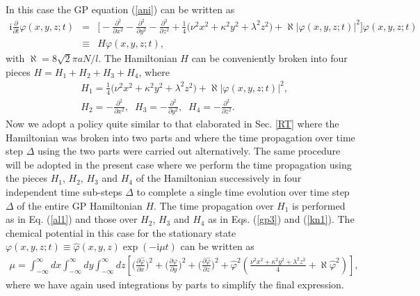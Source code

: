 \documentclass[onecolumn]{elsart3p}
\begin{document}
In this case the GP equation (\ref{ani}) can be written as
\begin{eqnarray}
\mbox{i}
\frac{\partial}{\partial t}\varphi(x,y,z;t) &  =&
\biggr[
-\frac{\partial^2}{\partial  x^2}
-\frac{\partial^2}{\partial  y^2}
-\frac{\partial^2}{\partial  z^2}
+ \frac{1}{4} \biggr(\nu^2 x^2 + \kappa^2 y^2 + \lambda^2 z^2  \biggr)
+\aleph   %
|\varphi(x,y,z;t)|^2  \biggr]
\varphi(x,y,z;t) \nonumber \\ & \equiv & H \varphi(x,y,z;t)
,\label{a3}
\end{eqnarray}
with $\aleph %
= 8\sqrt 2 \pi {aN}/{l}$.
The Hamiltonian $H$ can be conveniently broken
into four pieces $H=H_1+H_2+H_3+H_4$, where
\begin{align}
& H_1= \frac{1}{4} \biggr(\nu^2 x^2 + \kappa^2 y^2 + \lambda^2 z^2
\biggr)
+\aleph  %
|\varphi(x,y,z;t)|^2,  \\
& H_2=-\frac{\partial^2}{\partial x^2}, \;\;
H_3=-\frac{\partial^2}{\partial y^2}, \;\;
H_4=-\frac{\partial^2}{\partial z^2}.
\end{align}
Now we adopt a policy quite similar to that elaborated in Sec.
\ref{RT} where the Hamiltonian was broken into two parts and where the
time propagation over time step $\Delta$ using the two parts were
carried out alternatively. The same procedure will be adopted in the
present case where we perform the time propagation using the pieces
$H_1$, $H_2$, $H_3$ and $H_4$ of the Hamiltonian successively in four
independent time sub-steps $\Delta$ to complete a single time
evolution over time step $\Delta$ of the entire GP Hamiltonian $H$.
The time propagation over $H_1$ is performed as in Eq. (\ref{al1}) and
those over $H_2$, $H_3$ and $H_4$ as in Eqs. (\ref{gp3}) and (\ref{kn1}).
The chemical potential in this case for the stationary state
$ \varphi(x,y,z;t)\equiv \hat \varphi(x,y,z)\exp(-\mbox{i}\mu t)$
can
be
written as
\begin{align}
\mu =
\int_{-\infty}^\infty dx \int_{-\infty}^\infty dy \int_{-\infty}^\infty
dz \left[ \biggr(\frac{{\partial}
\hat \varphi}{{\partial}x} 
\biggr)^2 +
\biggr(\frac{{\partial}\hat 
\varphi}{{\partial}y}
\biggr)^2
+ \biggr(\frac{{\partial}\hat \varphi}
{{\partial}z} \biggr)^2 + 
\hat \varphi^2 \left(
\frac{\nu^2x^2+\kappa^2 y^2+\lambda^2 z^2}{4}+\aleph %
{\hat 
\varphi^2}
\right)
\right] ,
\end{align}{
where we have again used integrations by parts to simplify the
final expression.}
\end{document}
